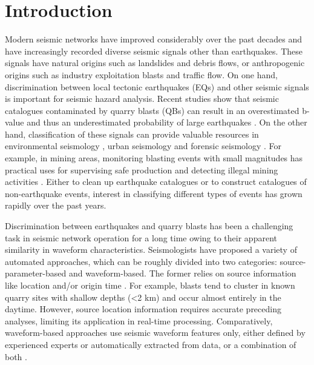 \documentclass{gji}
\begin{document}
\section{Introduction}
Modern seismic networks have improved considerably over the past decades and have increasingly recorded diverse seismic signals other than earthquakes. These signals have natural origins such as landslides and debris flows, or anthropogenic origins such as industry exploitation blasts and traffic flow. On one hand, discrimination between local tectonic earthquakes (EQs) and other seismic signals is important for seismic hazard analysis. Recent studies show that seismic catalogues contaminated by quarry blasts (QBs) can result in an overestimated b-value and thus an underestimated probability of large earthquakes \citep{tang,gulia_19,gulia_21}. On the other hand, classification of these signals can provide valuable resources in environmental seismology \citep{larose}, urban seismology \citep{diaz} and forensic seismology \citep{douglas}. For example, in mining areas, monitoring blasting events with small magnitudes has practical uses for supervising safe production and detecting illegal mining activities \citep{illegal,illegal_book}. Either to clean up earthquake catalogues or to construct catalogues of non-earthquake events, interest in classifying different types of events has grown rapidly over the past years.

Discrimination between earthquakes and quarry blasts has been a challenging task in seismic network operation for a long time owing to their apparent similarity in waveform characteristics. Seismologists have proposed a variety of automated approaches, which can be roughly divided into two categories: source-parameter-based and waveform-based. The former relies on source information like location and\slash or origin time \citep{fereidoni,wiemer,semiautomated}. For example, blasts tend to cluster in known quarry sites with shallow depths (\textless{2} km) and occur almost entirely in the daytime. However, source location information requires accurate preceding analyses, limiting its application in real-time processing. Comparatively, waveform-based approaches use seismic waveform features only, either defined by experienced experts or automatically extracted from data, or a combination of both \citep{allmann,wang_jgr,wang_grl,koper,koper_20,hartse,korrat,linville_19,miao,su,tibi_depth,tibi_compare,kong}.
\end{document}
